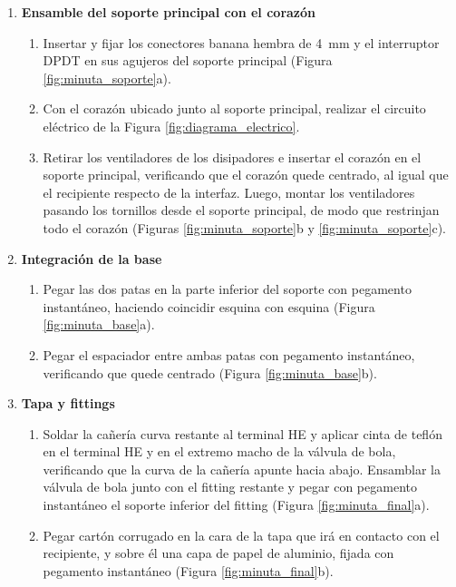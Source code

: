 \documentclass[12pt, a4paper]{article}
\begin{document}
\begin{enumerate}
    \item \textbf{Ensamble del soporte principal con el corazón}
    \begin{enumerate}[label=\alph*.]
        \item Insertar y fijar los conectores banana hembra de \SI{4}{\mm} y el interruptor DPDT en sus agujeros del soporte principal (Figura \ref{fig:minuta_soporte}a).
        \item Con el corazón ubicado junto al soporte principal, realizar el circuito eléctrico de la Figura \ref{fig:diagrama_electrico}.
        \item Retirar los ventiladores de los disipadores e insertar el corazón en el soporte principal, verificando que el corazón quede centrado, al igual que el recipiente respecto de la interfaz. Luego, montar los ventiladores pasando los tornillos desde el soporte principal, de modo que restrinjan todo el corazón (Figuras \ref{fig:minuta_soporte}b y \ref{fig:minuta_soporte}c).
    \end{enumerate}

    \item \textbf{Integración de la base}
    \begin{enumerate}[label=\alph*.]
        \item Pegar las dos patas en la parte inferior del soporte con pegamento instantáneo, haciendo coincidir esquina con esquina (Figura \ref{fig:minuta_base}a).
        \item Pegar el espaciador entre ambas patas con pegamento instantáneo, verificando que quede centrado (Figura \ref{fig:minuta_base}b).
    \end{enumerate}

    \item \textbf{Tapa y fittings}
    \begin{enumerate}[label=\alph*.]
        \item Soldar la cañería curva restante al terminal HE y aplicar cinta de teflón en el terminal HE y en el extremo macho de la válvula de bola, verificando que la curva de la cañería apunte hacia abajo. Ensamblar la válvula de bola junto con el fitting restante y pegar con pegamento instantáneo el soporte inferior del fitting (Figura \ref{fig:minuta_final}a).
        \item Pegar cartón corrugado en la cara de la tapa que irá en contacto con el recipiente, y sobre él una capa de papel de aluminio, fijada con pegamento instantáneo (Figura \ref{fig:minuta_final}b).
    \end{enumerate}
\end{enumerate}
\end{document}
